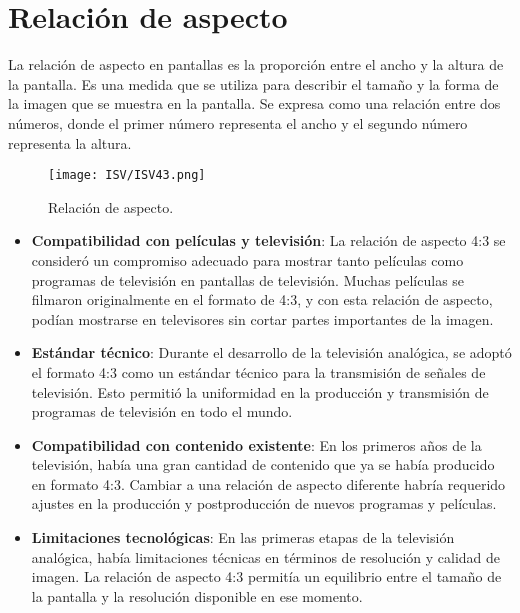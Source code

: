 \documentclass[
	12pt, %
	fleqn, %
	a4paper, %
	oneside, %
]{LegrandOrangeBook}
\begin{document}
\section{Relación de aspecto}
La relación de aspecto en pantallas es la proporción entre el ancho y la altura de la pantalla. Es una medida que se utiliza para describir el tamaño y la forma de la imagen que se muestra en la pantalla. Se expresa como una relación entre dos números, donde el primer número representa el ancho y el segundo número representa la altura.
\begin{figure}[H]
\centering
\texttt{[image: ISV/ISV43.png]}
\caption{Relación de aspecto.}
\end{figure}
\begin{itemize}
    \item \textbf{Compatibilidad con películas y televisión}: La relación de aspecto 4:3 se consideró un compromiso adecuado para mostrar tanto películas como programas de televisión en pantallas de televisión. Muchas películas se filmaron originalmente en el formato de 4:3, y con esta relación de aspecto, podían mostrarse en televisores sin cortar partes importantes de la imagen.
    
    \item \textbf{Estándar técnico}: Durante el desarrollo de la televisión analógica, se adoptó el formato 4:3 como un estándar técnico para la transmisión de señales de televisión. Esto permitió la uniformidad en la producción y transmisión de programas de televisión en todo el mundo.
    
    \item \textbf{Compatibilidad con contenido existente}: En los primeros años de la televisión, había una gran cantidad de contenido que ya se había producido en formato 4:3. Cambiar a una relación de aspecto diferente habría requerido ajustes en la producción y postproducción de nuevos programas y películas.
    
    \item \textbf{Limitaciones tecnológicas}: En las primeras etapas de la televisión analógica, había limitaciones técnicas en términos de resolución y calidad de imagen. La relación de aspecto 4:3 permitía un equilibrio entre el tamaño de la pantalla y la resolución disponible en ese momento.
\end{itemize}
\end{document}
